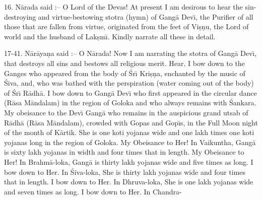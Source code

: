 16. N\=arada said :-- O Lord of the Devas! At present I am desirous to hear the sin-destroying and virtue-bestowing stotra (hymn) of Gang\=a Dev\={\i}, the Purifier of all those that are fallen from virtue, originated from the feet of Vi\d{s}\d{n}u, the Lord of world and the husband of Lak\d{s}m\={\i}. Kindly narrate all these in detail.

17-41. N\=ar\=aya\d{n}a said :-- O N\=arada! Now I am narrating the stotra of Gang\=a Dev\={\i}, that destroys all sins and bestows all religious merit. Hear. I bow down to the Ganges who appeared from the body of \'Sr\={\i} Kri\d{s}\d{n}a, enchanted by the music of \'Siva, and, who was bathed with the perspiration (water coming out of the body) of \'Sr\={\i} R\=adh\=a. I bow down to Gang\=a Dev\={\i} who first appeared in the circular dance (R\=asa M\=andalam) in the region of Goloka and who always remains with \'Sankara. My obeisance to the Dev\={\i} Gang\=a who remains in the auspicious grand utsab of R\=adh\=a (R\=asa M\=andalam), crowded with Gopas and Gop\={\i}s, in the Full Moon night of the month of K\=artik. She is one koti yojanas wide and one lakh times one koti yojanas long in the region of Goloka. My Obeisance to Her! In Vaikuntha, Gang\=a is sixty lakh yojanas in width and four times that in length. My Obeisance to Her! In Brahm\=a-loka, Gang\=a is thirty lakh yojanas wide and five times as long. I bow down to Her. In \'Siva-loka, She is thirty lakh yojanas wide and four times that in length. I bow down to Her. In Dhruva-loka, She is one lakh yojanas wide and seven times as long. I bow down to Her. In Chandra-

